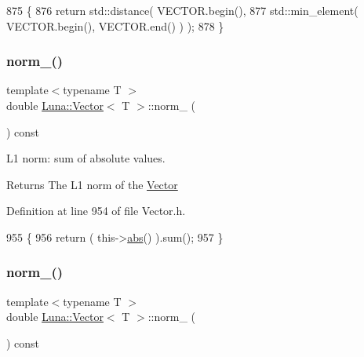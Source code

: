\begin{DoxyCode}
875   \{
876     \textcolor{keywordflow}{return} std::distance( VECTOR.begin(),
877                            std::min\_element( VECTOR.begin(), VECTOR.end() ) );
878   \}
\end{DoxyCode}
\mbox{\label{classLuna_1_1Vector_a7f36db8f617c64ebe772e2af28c3e475}} 
\subsubsection{\texorpdfstring{norm\+\_()}{norm\_1()}}
{\footnotesize\ttfamily template$<$typename T $>$ \\
double \hyperlink{classLuna_1_1Vector}{Luna\+::\+Vector}$<$ T $>$\+::norm\+\_ (\begin{DoxyParamCaption}{ }\end{DoxyParamCaption}) const\hspace{0.3cm}{\ttfamily [inline]}}



L1 norm\+: sum of absolute values. 

\begin{DoxyReturn}{Returns}
The L1 norm of the \hyperlink{classLuna_1_1Vector}{Vector} 
\end{DoxyReturn}


Definition at line 954 of file Vector.\+h.


\begin{DoxyCode}
955   \{
956     \textcolor{keywordflow}{return} ( this->\hyperlink{classLuna_1_1Vector_a1fe66d19f6641be9e301a306fdb58cbe}{abs}() ).sum();
957   \}
\end{DoxyCode}
\mbox{\label{classLuna_1_1Vector_a1b06ed062a50b1006f991ffad6b9b8f4}} 
\subsubsection{\texorpdfstring{norm\+\_()}{norm\_2()}}
{\footnotesize\ttfamily template$<$typename T $>$ \\
double \hyperlink{classLuna_1_1Vector}{Luna\+::\+Vector}$<$ T $>$\+::norm\+\_ (\begin{DoxyParamCaption}{ }\end{DoxyParamCaption}) const\hspace{0.3cm}{\ttfamily [inline]}}



